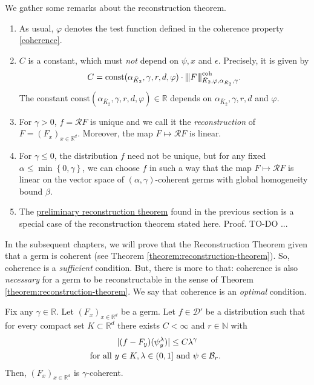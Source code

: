 \begin{remark} 
   We gather some remarks about the reconstruction theorem.
\begin{enumerate}
   \item As usual, $\varphi$ denotes the test function defined in the coherence property \eqref{coherence}.
   \item $C$ is a constant, which must \emph{not} depend on $\psi,x$ and $\epsilon$. Precisely, it is given by \begin{align*}
           C = \mathrm{const}(\alpha_{\bar K_2}, \gamma, r, d, \varphi) \cdot {\left\vert\kern-0.25ex\left\vert\kern-0.25ex\left\vert F \right\vert\kern-0.25ex\right\vert\kern-0.25ex\right\vert}^{\mathrm{coh}}_{\bar K_2, \varphi, \alpha_{\bar K_2}, \gamma}.
   \end{align*}
   The constant $\mathrm{const}(\alpha_{\bar K_2}, \gamma, r, d, \varphi) \in \mathbb{R}$ depends on $\alpha_{\bar K_2}, \gamma, r, d$ and $\varphi$.
   \item For $\gamma > 0$, $f = \mathcal{R}F$ is unique and we call it the \emph{reconstruction} of $F = (F_x)_{x \in \mathbb{R}^d}$. Moreover, the map $F \mapsto \mathcal{R}F$ is linear.
   \item For $\gamma \leq 0$, the distribution $f$ need not be unique, but for any fixed $\alpha \leq \min\left\{ 0, \gamma \right\}$, we can choose $f$ in such a way that the map $F \mapsto \mathcal{R}F$ is linear on the vector space of $(\alpha,\gamma)$-coherent germs with global homogeneity bound $\beta$.
   \item The \hyperref[peek:prelim-reconstruction-theorem]{preliminary reconstruction theorem} found in the previous section is a special case of the reconstruction theorem stated here. Proof. TO-DO ...
\end{enumerate}
\end{remark}

In the subsequent chapters, we will prove that the Reconstruction Theorem given that a germ is coherent (see Theorem \ref{theorem:reconstruction-theorem}). So, coherence is a \emph{sufficient} condition. But, there is more to that: coherence is also \emph{necessary} for a germ to be reconstructable in the sense of Theorem \ref{theorem:reconstruction-theorem}. We say that coherence is an \emph{optimal} condition.

\begin{theorem}\label{theorem:coherence-is-necessary}
   Fix any $\gamma \in \mathbb{R}$.  Let $(F_x)_{x \in \mathbb{R}^d}$ be a germ. Let $f \in \mathcal{D}'$ be a distribution such that for every compact set $K \subset \mathbb{R}^d$ there exists $C < \infty$ and $r \in \mathbb{N}$ with
   \begin{gather}\label{thm:coh-necessary}
        |(f-F_y)(\psi^\lambda_y)| \leq C \lambda^\gamma \\
        \text{for all $y \in K, \lambda \in (0,1]$ and $\psi \in \mathcal{B}_r$. \nonumber  }
   \end{gather}
   Then, $(F_x)_{x \in \mathbb{R}^d}$ is $\gamma$-coherent.  
\end{theorem}

